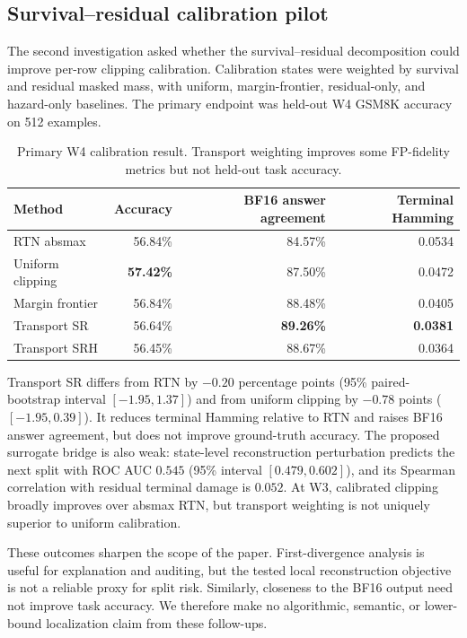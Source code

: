 \subsection{Survival--residual calibration pilot}
The second investigation asked whether the survival--residual decomposition could improve per-row clipping calibration. Calibration states were weighted by survival and residual masked mass, with uniform, margin-frontier, residual-only, and hazard-only baselines. The primary endpoint was held-out W4 GSM8K accuracy on 512 examples.

\begin{table}[H]
\caption{Primary W4 calibration result. Transport weighting improves some FP-fidelity metrics but not held-out task accuracy.}
\label{tab:negative-calibration}
\centering\small
\begin{tabular}{@{}lrrr@{}}
\toprule
Method & Accuracy & BF16 answer agreement & Terminal Hamming \\
\midrule
RTN absmax & 56.84\% & 84.57\% & 0.0534 \\
Uniform clipping & \textbf{57.42\%} & 87.50\% & 0.0472 \\
Margin frontier & 56.84\% & 88.48\% & 0.0405 \\
Transport SR & 56.64\% & \textbf{89.26\%} & \textbf{0.0381} \\
Transport SRH & 56.45\% & 88.67\% & 0.0364 \\
\bottomrule
\end{tabular}
\end{table}

Transport SR differs from RTN by $-0.20$ percentage points (95\% paired-bootstrap interval $[-1.95,1.37]$) and from uniform clipping by $-0.78$ points ($[-1.95,0.39]$). It reduces terminal Hamming relative to RTN and raises BF16 answer agreement, but does not improve ground-truth accuracy. The proposed surrogate bridge is also weak: state-level reconstruction perturbation predicts the next split with ROC AUC $0.545$ (95\% interval $[0.479,0.602]$), and its Spearman correlation with residual terminal damage is $0.052$. At W3, calibrated clipping broadly improves over absmax RTN, but transport weighting is not uniquely superior to uniform calibration.

These outcomes sharpen the scope of the paper. First-divergence analysis is useful for explanation and auditing, but the tested local reconstruction objective is not a reliable proxy for split risk. Similarly, closeness to the BF16 output need not improve task accuracy. We therefore make no algorithmic, semantic, or lower-bound localization claim from these follow-ups.
